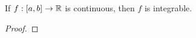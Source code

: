 \documentclass[../main.tex]{subfiles}
\begin{document}
\begin{theorem}\label{trm:13.19}
    If $f:[a,b]\to\mathbb{R}$ is continuous, then $f$ is integrable.
    \begin{proof}

\end{proof}
\end{theorem}
\end{document}
